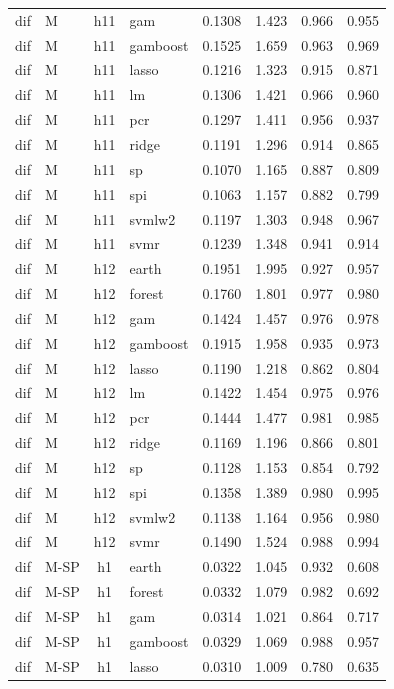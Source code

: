 \begin{ThreePartTable}
\begin{longtable}[t]{llclcccc}
dif & M & h11 & gam & 0.1308 & 1.423 & 0.966 & 0.955\\
dif & M & h11 & gamboost & 0.1525 & 1.659 & 0.963 & 0.969\\
dif & M & h11 & lasso & 0.1216 & 1.323 & 0.915 & 0.871\\
dif & M & h11 & lm & 0.1306 & 1.421 & 0.966 & 0.960\\
dif & M & h11 & pcr & 0.1297 & 1.411 & 0.956 & 0.937\\
dif & M & h11 & ridge & 0.1191 & 1.296 & 0.914 & 0.865\\
dif & M & h11 & sp & 0.1070 & 1.165 & 0.887 & 0.809\\
dif & M & h11 & spi & 0.1063 & 1.157 & 0.882 & 0.799\\
dif & M & h11 & svmlw2 & 0.1197 & 1.303 & 0.948 & 0.967\\
dif & M & h11 & svmr & 0.1239 & 1.348 & 0.941 & 0.914\\
\addlinespace
dif & M & h12 & earth & 0.1951 & 1.995 & 0.927 & 0.957\\
dif & M & h12 & forest & 0.1760 & 1.801 & 0.977 & 0.980\\
dif & M & h12 & gam & 0.1424 & 1.457 & 0.976 & 0.978\\
dif & M & h12 & gamboost & 0.1915 & 1.958 & 0.935 & 0.973\\
dif & M & h12 & lasso & 0.1190 & 1.218 & 0.862 & 0.804\\
dif & M & h12 & lm & 0.1422 & 1.454 & 0.975 & 0.976\\
dif & M & h12 & pcr & 0.1444 & 1.477 & 0.981 & 0.985\\
dif & M & h12 & ridge & 0.1169 & 1.196 & 0.866 & 0.801\\
dif & M & h12 & sp & 0.1128 & 1.153 & 0.854 & 0.792\\
dif & M & h12 & spi & 0.1358 & 1.389 & 0.980 & 0.995\\
dif & M & h12 & svmlw2 & 0.1138 & 1.164 & 0.956 & 0.980\\
dif & M & h12 & svmr & 0.1490 & 1.524 & 0.988 & 0.994\\
\addlinespace
dif & M-SP & h1 & earth & 0.0322 & 1.045 & 0.932 & 0.608\\
dif & M-SP & h1 & forest & 0.0332 & 1.079 & 0.982 & 0.692\\
dif & M-SP & h1 & gam & 0.0314 & 1.021 & 0.864 & 0.717\\
dif & M-SP & h1 & gamboost & 0.0329 & 1.069 & 0.988 & 0.957\\
dif & M-SP & h1 & lasso & 0.0310 & 1.009 & 0.780 & 0.635\\

\end{longtable}
\end{ThreePartTable}
